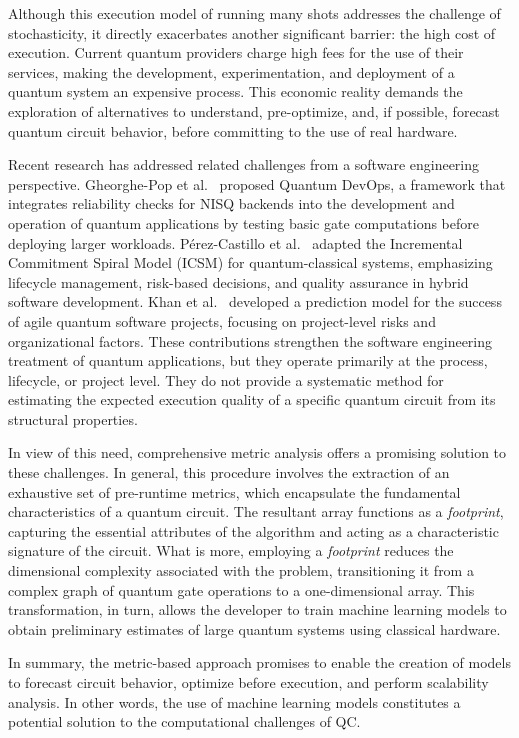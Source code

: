 \documentclass{article}
\begin{document}
Although this execution model of running many shots addresses the challenge of stochasticity, it directly exacerbates another significant barrier: the high cost of execution. Current quantum providers charge high fees for the use of their services, making the development, experimentation, and deployment of a quantum system an expensive process. This economic reality demands the exploration of alternatives to understand, pre-optimize, and, if possible, forecast quantum circuit behavior, before committing to the use of real hardware.

Recent research has addressed related challenges from a software engineering perspective. Gheorghe-Pop et al.~\cite{gheorghePopQuantumDevops_2020} proposed Quantum DevOps, a framework that integrates reliability checks for NISQ backends into the development and operation of quantum applications by testing basic gate computations before deploying larger workloads. Pérez-Castillo et al.~\cite{perezCastilloGuidelinesIncremental_2024} adapted the Incremental Commitment Spiral Model (ICSM) for quantum-classical systems, emphasizing lifecycle management, risk-based decisions, and quality assurance in hybrid software development. Khan et al.~\cite{khanAgileMeetsQuantum_2024} developed a prediction model for the success of agile quantum software projects, focusing on project-level risks and organizational factors. These contributions strengthen the software engineering treatment of quantum applications, but they operate primarily at the process, lifecycle, or project level. They do not provide a systematic method for estimating the expected execution quality of a specific quantum circuit from its structural properties.

In view of this need, comprehensive metric analysis offers a promising solution to these challenges. In general, this procedure involves the extraction of an exhaustive set of pre-runtime metrics, which encapsulate the fundamental characteristics of a quantum circuit. The resultant array functions as a \textit{footprint}, capturing the essential attributes of the algorithm and acting as a characteristic signature of the circuit. What is more, employing a \textit{footprint} reduces the dimensional complexity associated with the problem, transitioning it from a complex graph of quantum gate operations to a one-dimensional array. This transformation, in turn, allows the developer to train machine learning models to obtain preliminary estimates of large quantum systems using classical hardware.

In summary, the metric-based approach promises to enable the creation of models to forecast circuit behavior, optimize before execution, and perform scalability analysis. In other words, the use of machine learning models constitutes a potential solution to the computational challenges of QC.
\end{document}
